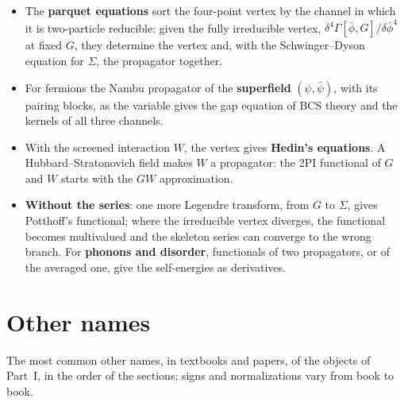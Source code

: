 \documentclass[11pt,a4paper]{article}
\begin{document}
\begin{itemize}[leftmargin=1.2em, itemsep=0pt]
  an external field coupled to that operator; it gives the response functions and the self-energy by the equation of
  motion.
\item The \textbf{parquet equations} sort the four-point vertex by the channel in which it is two-particle reducible: given
  the fully irreducible vertex, $\delta^4\Gamma[\bar\phi,G]/\delta\bar\phi^4$ at fixed $G$, they determine the vertex and, with the Schwinger--Dyson equation for $\Sigma$, the propagator together.
\item For fermions the Nambu propagator of the \textbf{superfield} $(\psi,\bar\psi)$, with its pairing blocks, as the
  variable gives the gap equation of BCS theory and the kernels of all three channels.
\item With the screened interaction $W$, the vertex gives \textbf{Hedin's equations}. A Hubbard--Stratonovich field makes $W$
  a propagator: the 2PI functional of $G$ and $W$ starts with the $GW$ approximation.
\item \textbf{Without the series}: one more Legendre transform, from $G$ to $\Sigma$, gives Potthoff's functional; where the
  irreducible vertex diverges, the functional becomes multivalued and the skeleton series can converge to the wrong
  branch. For
  \textbf{phonons and disorder}, functionals of two propagators, or of the averaged one, give the self-energies as derivatives.
\end{itemize}

\section*{Other names}\label{sec:names}

The most common other names, in textbooks and papers, of the objects of Part~I, in the order of the sections;
signs and normalizations vary from book to book.
\end{document}
